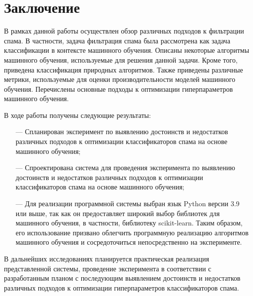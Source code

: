 \chapter*{Заключение}

В рамках данной работы осуществлен обзор различных подходов к фильтрации
спама. В частности, задача фильтрация спама была рассмотрена как задача
классификации в контексте машинного обучения. Описаны некоторые алгоритмы
машинного обучения, используемые для решения данной задачи. Кроме того,
приведена классификация природных алгоритмов.
Также приведены различные метрики, используемые для оценки производительности
моделей машинного обучения. Перечислены основные подходы к оптимизации гиперпараметров
машинного обучения.

В ходе работы получены следующие результаты:
\begin{enumerate}

    \item[—] Спланирован эксперимент по выявлению достоинств и недостатков различных
        подходов к оптимизации классификаторов спама на основе машинного обучения;

    \item[—] Спроектирована система для проведения эксперимента по выявлению достоинств и
        недостатков различных подходов к оптимизации классификаторов спама на основе машинного
        обучения;

    \item[—] Для реализации программной системы выбран язык Python версии 3.9 или выше,
        так как он предоставляет широкий выбор библиотек для машинного обучения, в частности,
        библиотеку scikit-learn. Таким образом, его использование призвано облегчить программную
        реализацию алгоритмов машинного обучения и сосредоточиться непосредственно на
        эксперименте.
\end{enumerate}

В дальнейших исследованиях планируется практическая реализация представленной системы,
проведение эксперимента в соответствии с разработанным планом с последующим
выявлением достоинств и недостатков различных подходов к оптимизации гиперпараметров
классификаторов спама.
